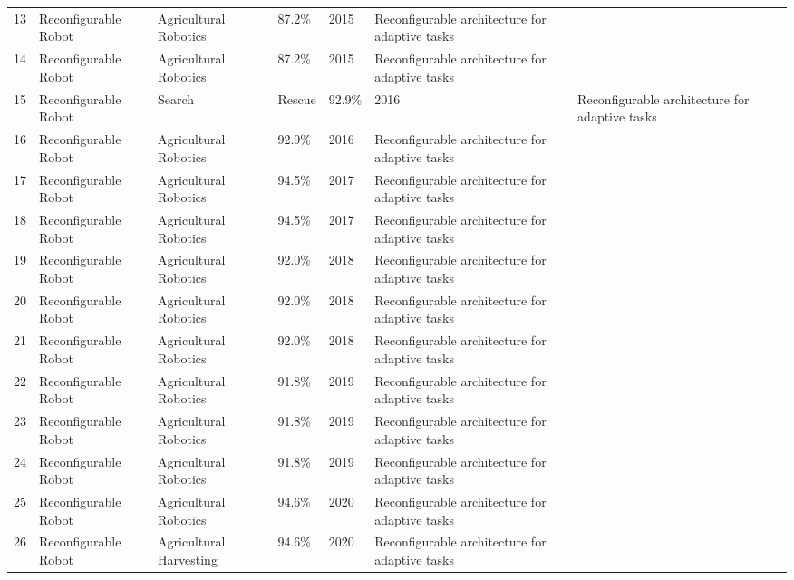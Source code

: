 \begin{table*}[htbp]
\begin{tabular}{p{}p{}p{}p{}p{}p{}p{}}
 13 & Reconfigurable Robot & Agricultural Robotics & 87.2\% & 2015 & Reconfigurable architecture for adaptive tasks & \cite{chen2015design} \\
 14 & Reconfigurable Robot & Agricultural Robotics & 87.2\% & 2015 & Reconfigurable architecture for adaptive tasks & \cite{gao2015reconfigurable} \\
 15 & Reconfigurable Robot & Search & Rescue & 92.9\% & 2016 & Reconfigurable architecture for adaptive tasks & \cite{li2016reconfigurable} \\
 16 & Reconfigurable Robot & Agricultural Robotics & 92.9\% & 2016 & Reconfigurable architecture for adaptive tasks & \cite{wang2016design} \\
 17 & Reconfigurable Robot & Agricultural Robotics & 94.5\% & 2017 & Reconfigurable architecture for adaptive tasks & \cite{zhang2017reconfigurable} \\
 18 & Reconfigurable Robot & Agricultural Robotics & 94.5\% & 2017 & Reconfigurable architecture for adaptive tasks & \cite{chen2017design} \\
 19 & Reconfigurable Robot & Agricultural Robotics & 92.0\% & 2018 & Reconfigurable architecture for adaptive tasks & \cite{li2018reconfigurable} \\
 20 & Reconfigurable Robot & Agricultural Robotics & 92.0\% & 2018 & Reconfigurable architecture for adaptive tasks & \cite{wang2018design} \\
 21 & Reconfigurable Robot & Agricultural Robotics & 92.0\% & 2018 & Reconfigurable architecture for adaptive tasks & \cite{zhang2018reconfigurable} \\
 22 & Reconfigurable Robot & Agricultural Robotics & 91.8\% & 2019 & Reconfigurable architecture for adaptive tasks & \cite{chen2019design} \\
 23 & Reconfigurable Robot & Agricultural Robotics & 91.8\% & 2019 & Reconfigurable architecture for adaptive tasks & \cite{li2019reconfigurable} \\
 24 & Reconfigurable Robot & Agricultural Robotics & 91.8\% & 2019 & Reconfigurable architecture for adaptive tasks & \cite{wang2019design} \\
 25 & Reconfigurable Robot & Agricultural Robotics & 94.6\% & 2020 & Reconfigurable architecture for adaptive tasks & \cite{zhang2020reconfigurable} \\
 26 & Reconfigurable Robot & Agricultural Harvesting & 94.6\% & 2020 & Reconfigurable architecture for adaptive tasks & \cite{chen2020design} \\

\end{tabular}
\end{table*}
